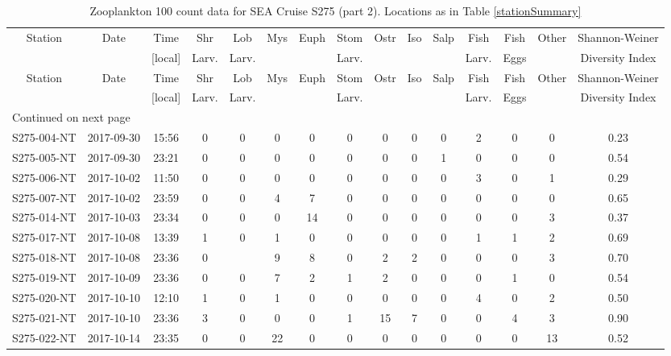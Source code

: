 \begin{longtable}{ccccccccccccccc}
\caption{\label{100count2} Zooplankton 100 count data for SEA Cruise S275 (part 2). Locations as in Table \ref{stationSummary}} \\ 
 Station & Date & Time & Shr & Lob & Mys & Euph & Stom & Ostr & Iso & Salp & Fish & Fish & Other & Shannon-Weiner \\ 
   &  & [local] & Larv. & Larv. &  &  & Larv. &  &  &  & Larv. & Eggs &  & Diversity Index \\ 
\hline\n\endfirsthead
Station & Date & Time & Shr & Lob & Mys & Euph & Stom & Ostr & Iso & Salp & Fish & Fish & Other & Shannon-Weiner \\ 
 &  & [local] & Larv. & Larv. &  &  & Larv. &  &  &  & Larv. & Eggs &  & Diversity Index \\ 
\hline
\endhead
\hline
\multicolumn{15}{l}{\footnotesize Continued on next page}
\endfoot
\endlastfoot
 \hline
S275-002-NT & 2017-09-29 & 23:48 & 0 & 0 & 0 & 5 & 0 & 1 & 0 & 0 & 1 & 0 & 0 & 0.31 \\ 
  S275-004-NT & 2017-09-30 & 15:56 & 0 & 0 & 0 & 0 & 0 & 0 & 0 & 0 & 2 & 0 & 0 & 0.23 \\ 
  S275-005-NT & 2017-09-30 & 23:21 & 0 & 0 & 0 & 0 & 0 & 0 & 0 & 1 & 0 & 0 & 0 & 0.54 \\ 
  S275-006-NT & 2017-10-02 & 11:50 & 0 & 0 & 0 & 0 & 0 & 0 & 0 & 0 & 3 & 0 & 1 & 0.29 \\ 
  S275-007-NT & 2017-10-02 & 23:59 & 0 & 0 & 4 & 7 & 0 & 0 & 0 & 0 & 0 & 0 & 0 & 0.65 \\ 
  S275-014-NT & 2017-10-03 & 23:34 & 0 & 0 & 0 & 14 & 0 & 0 & 0 & 0 & 0 & 0 & 3 & 0.37 \\ 
  S275-017-NT & 2017-10-08 & 13:39 & 1 & 0 & 1 & 0 & 0 & 0 & 0 & 0 & 1 & 1 & 2 & 0.69 \\ 
  S275-018-NT & 2017-10-08 & 23:36 & 0 &  & 9 & 8 & 0 & 2 & 2 & 0 & 0 & 0 & 3 & 0.70 \\ 
  S275-019-NT & 2017-10-09 & 23:36 & 0 & 0 & 7 & 2 & 1 & 2 & 0 & 0 & 0 & 1 & 0 & 0.54 \\ 
  S275-020-NT & 2017-10-10 & 12:10 & 1 & 0 & 1 & 0 & 0 & 0 & 0 & 0 & 4 & 0 & 2 & 0.50 \\ 
  S275-021-NT & 2017-10-10 & 23:36 & 3 & 0 & 0 & 0 & 1 & 15 & 7 & 0 & 0 & 4 & 3 & 0.90 \\ 
  S275-022-NT & 2017-10-14 & 23:35 & 0 & 0 & 22 & 0 & 0 & 0 & 0 & 0 & 0 & 0 & 13 & 0.52 \\ 

\end{longtable}
